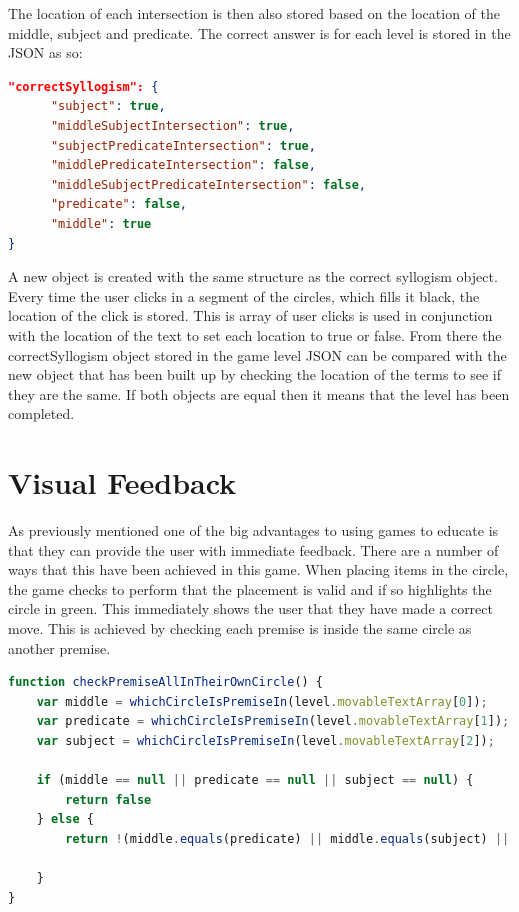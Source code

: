 \documentclass[12pt,a4paper]{report}
\begin{document}
The location of each intersection is then also stored based on the location of the middle, subject and predicate.
The correct answer is for each level is stored in the JSON as so:
\begin{lstlisting}[language=json]
"correctSyllogism": {
      "subject": true,
      "middleSubjectIntersection": true,
      "subjectPredicateIntersection": true,
      "middlePredicateIntersection": false,
      "middleSubjectPredicateIntersection": false,
      "predicate": false,
      "middle": true
}
\end{lstlisting}

A new object is created with the same structure as the correct syllogism object.
Every time the user clicks in a segment of the circles, which fills it black, the location of the click is stored. This is array of user clicks is used in conjunction with the location of the text to set each location to true or false. From there the correctSyllogism object stored in the game level JSON can be compared with the new object that has been built up by checking the location of the terms to see if they are the same. If both objects are equal then it means that the level has been completed.

\section{Visual Feedback}
As previously mentioned one of the big advantages to using games to educate is that they can provide the user with immediate feedback. There are a number of ways that this have been achieved in this game. When placing items in the circle, the game checks to perform that the placement is valid and if so highlights the circle in green. This immediately shows the user that they have made a correct move.  This is achieved by checking each premise is inside the same circle as another premise.

\begin{lstlisting}[language=JavaScript]
function checkPremiseAllInTheirOwnCircle() {
    var middle = whichCircleIsPremiseIn(level.movableTextArray[0]);
    var predicate = whichCircleIsPremiseIn(level.movableTextArray[1]);
    var subject = whichCircleIsPremiseIn(level.movableTextArray[2]);

    if (middle == null || predicate == null || subject == null) {
        return false
    } else {
        return !(middle.equals(predicate) || middle.equals(subject) || predicate.equals(subject));

    }
}
\end{lstlisting}
\end{document}
